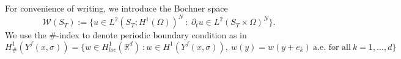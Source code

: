 \documentclass[reqno, 11pt]{amsart}
\newtheorem{rem}[thm]{Remark}
\numberwithin{equation}{section}
\def\R{{\Bbb R}}
\def\R{{\mathbb R}}
\newcommand{\ee}{{\mathrm{e}}}
\def\be{\begin{equation}}
\def\ee{\end{equation}}
\def\bse{\begin{subequations}}
\def\ese{\end{subequations}}
\newcommand{\clr}{\color{red}}
\begin{document}
%
%
%
%
%
%

For convenience of writing,  we introduce the Bochner space
%
\[
\mathcal{W}(S_T):=\{u\in L^2(S_T;H^1(\Omega))^N\ :\ \partial_tu\in L^2(S_T\times\Omega)^N\}.
\]
We use the $\#$-index to denote periodic boundary condition as in
%
\[
H^1_\#(Y^f(x,\sigma))=\{w\in H^1_{loc}(\R^d)\ :w\in H^1(Y^f(x,\sigma)), \ w(y)=w(y+e_k)\ \text{a.e.~for all}\ k=1,...,d\}
\]
\end{document}
